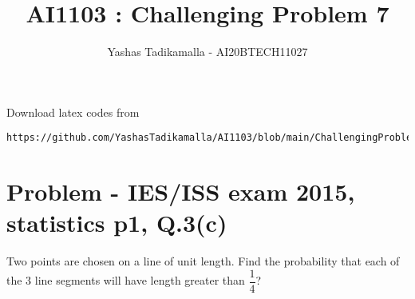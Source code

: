 \documentclass[journal,12pt,twocolumn]{IEEEtran}
\begin{document}
\let\vec\mathbf
\renewcommand{\thefigure}{\theproblem}
\def\putbox#1#2#3{\makebox[0in][l]{\makebox[#1][l]{}\raisebox{\baselineskip}[0in][0in]{\raisebox{#2}[0in][0in]{#3}}}}
     \def\rightbox#1{\makebox[0in][r]{#1}}
     \def\centbox#1{\makebox[0in]{#1}}
     \def\topbox#1{\raisebox{-\baselineskip}[0in][0in]{#1}}
     \def\midbox#1{\raisebox{-0.5\baselineskip}[0in][0in]{#1}}
\vspace{3cm}
\title{AI1103 : Challenging Problem 7}
\author{Yashas Tadikamalla - AI20BTECH11027}
\maketitle
\newpage
\bigskip
\renewcommand{\thefigure}{\arabic{figure}}
\renewcommand{\thetable}{\arabic{table}}
Download latex codes from 
%
\begin{lstlisting}
https://github.com/YashasTadikamalla/AI1103/blob/main/ChallengingProblem7/ChallengingProblem7.tex
\end{lstlisting}
\section*{Problem - IES/ISS exam 2015, statistics p1, Q.3(c)}
Two points are chosen on a line of unit length. Find the probability that each of the 3 line segments will have length greater than $\dfrac{1}{4}$?
\end{document}
